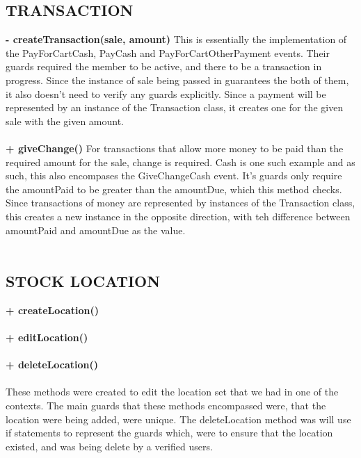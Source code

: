 \documentclass[a4paper]{article}
\begin{document}
\subsection{TRANSACTION}
{\bf - createTransaction(sale, amount)}
This is essentially the implementation of the PayForCartCash, PayCash and PayForCartOtherPayment events. Their guards required the member to be active, and there to be a transaction in progress. Since the instance of sale being passed in guarantees the both of them, it also doesn’t need to verify any guards explicitly. Since a payment will be represented by an instance of the Transaction class, it creates one for the given sale with the given amount.
\\\\
{\bf + giveChange()}
For transactions that allow more money to be paid than the required amount for the sale, change is required. Cash is one such example and as such, this also encompases the GiveChangeCash event. It’s guards only require the amountPaid to be greater than the amountDue, which this method checks. Since transactions of money are represented by instances of the Transaction class, this creates a new instance in the opposite direction, with teh difference between amountPaid and amountDue as the value.
\\\\
\subsection{STOCK LOCATION}
{\bf + createLocation()}\\\\
{\bf + editLocation()}\\\\
{\bf + deleteLocation()}\\\\
These methods were created to edit the location set that we had in one of the contexts. The main guards that these methods encompassed were, that the location were being added, were unique. The deleteLocation method was will use if statements to represent the guards which, were to ensure that the location existed, and was being delete by a verified users. 
\\\\
\end{document}
